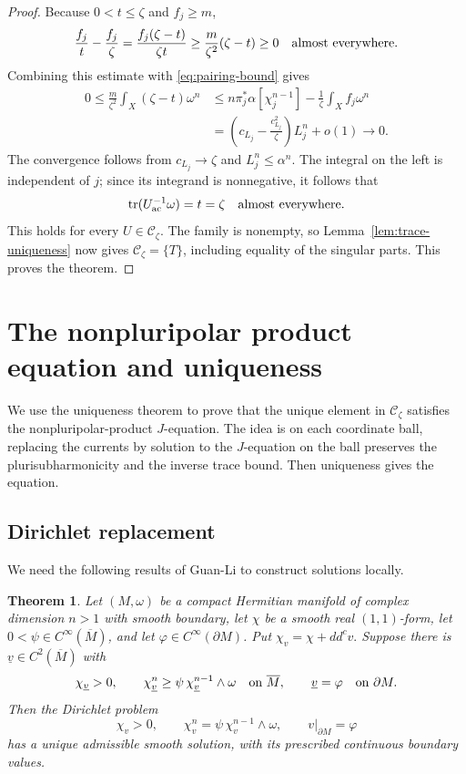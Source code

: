 \documentclass[reqno]{amsart}
\numberwithin{equation}{section}
\newtheorem{theorem}{Theorem}[section]
\theoremstyle{definition}
\DeclareMathOperator{\tr}{tr}
\newcommand{\ddc}{dd^c}
\newcommand{\cC}{\mathcal C}
\begin{document}
\begin{proof}
Because $0<t\le\zeta$ and $f_j\ge m$,
\begin{equation}\label{eq:trace-defect}
\frac{f_j}{t}-\frac{f_j}{\zeta}
=\frac{f_j(\zeta-t)}{\zeta t}
\ge\frac{m}{\zeta^2}(\zeta-t)\ge0
\quad\hbox{almost everywhere}.
\end{equation}
Combining this estimate with
\eqref{eq:pairing-bound} gives
\begin{equation}\label{eq:defect-limit}
\begin{aligned}
0\le\frac{m}{\zeta^2}\int_X(\zeta-t)\omega^n
&\le n\pi_j^*\alpha[\chi_j^{n-1}]
 -\frac1\zeta\int_Xf_j\omega^n\\
&=\left(c_{L_j}-\frac{c_{L_j}^2}{\zeta}\right)L_j^n+o(1)
 \longrightarrow0.
\end{aligned}
\end{equation}
The convergence follows from $c_{L_j}\to\zeta$ and
$L_j^n\le\alpha^n$. The integral on the left is independent of $j$;
since its integrand is nonnegative, it follows that
\[
\tr(U_{\rm ac}^{-1}\omega)=t=\zeta
\quad\hbox{almost everywhere}.
\]
This holds for every $U\in\mathcal C_\zeta$.
The family is nonempty, so Lemma~\ref{lem:trace-uniqueness}
now gives $\mathcal C_\zeta=\{T\}$, including equality of the
singular parts. This proves the theorem.
    
\end{proof}

\section{The nonpluripolar product equation and uniqueness}\label{sec:scalar}
We use the uniqueness theorem to prove that the unique element in $\cC_\zeta$ satisfies the nonpluripolar-product $J$-equation. The idea is on each coordinate ball, replacing the currents by solution to the $J$-equation on the ball preserves the plurisubharmonicity and the inverse trace bound. Then uniqueness gives the equation. 

\subsection{Dirichlet replacement}
We need the following results of Guan-Li \cite{GL12} to construct solutions locally. 
\begin{theorem}\label{thm:dirichlet}
    Let $(M,\omega)$ be a compact Hermitian manifold of complex dimension $n>1$ with smooth boundary, let $\chi$ be a smooth real $(1,1)$-form, let $0<\psi\in C^\infty(\overline M)$, and let $\varphi\in C^\infty(\partial M)$. Put $\chi_v=\chi+\ddc v.$
Suppose there is $\underline v\in C^2(\overline M)$ with
\[
\chi_{\underline v}>0,\qquad
\chi_{\underline v}^n\geq
\psi\,\chi_{\underline v}^{n-1}\wedge\omega
\quad\hbox{on }\overline M,\qquad
\underline v=\varphi\quad\hbox{on }\partial M.
\]
Then the Dirichlet problem
\begin{equation}\label{eq:dirichlet}
\chi_v>0,\qquad
\chi_v^n=\psi\,\chi_v^{n-1}\wedge\omega,
\qquad v|_{\partial M}=\varphi
\end{equation}
has a unique admissible smooth solution, with its prescribed continuous boundary values. 
\end{theorem}
\end{document}
